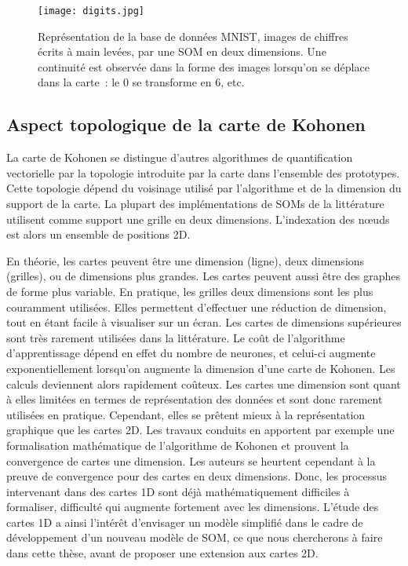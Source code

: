\documentclass[../main]{subfiles}
\begin{document}
\begin{figure}
\centering
\texttt{[image: digits.jpg]}
\caption{Représentation de la base de données MNIST, images de chiffres écrits à main levées, par une SOM en deux dimensions. Une continuité est observée dans la forme des images lorsqu'on se déplace dans la carte~: le $0$ se transforme en $6$, etc.}
\label{fig:SOM}
\end{figure}

\subsection{Aspect topologique de la carte de Kohonen}

La carte de Kohonen se distingue d'autres algorithmes de quantification vectorielle par la topologie introduite par la carte dans l'ensemble des prototypes. Cette topologie dépend du voisinage utilisé par l'algorithme et de la dimension du support de la carte.
La plupart des implémentations de SOMs de la littérature utilisent comme support une grille en deux dimensions. L'indexation des n\oe{}uds est alors un ensemble de positions 2D.

En théorie, les cartes peuvent être une dimension (ligne), deux dimensions (grilles), ou de dimensions plus grandes. Les cartes peuvent aussi être des graphes de forme plus variable. En pratique, les grilles deux dimensions sont les plus couramment utilisées. Elles permettent d'effectuer une réduction de dimension, tout en étant facile à visualiser sur un écran. Les cartes de dimensions supérieures sont très rarement utilisées dans la littérature. Le coût de l'algorithme d'apprentissage dépend en effet du nombre de neurones, et celui-ci augmente exponentiellement lorsqu'on augmente la dimension d'une carte de Kohonen. Les calculs deviennent alors rapidement coûteux.
Les cartes une dimension sont quant à elles limitées en termes de représentation des données et sont donc rarement utilisées en pratique. Cependant, elles se prêtent mieux à la représentation graphique que les cartes 2D.
Les travaux conduits en \cite{cottrell_theoretical_2016,fort_soms_2006} apportent par exemple une formalisation mathématique de l'algorithme de Kohonen et prouvent la convergence de cartes une dimension. Les auteurs se heurtent cependant à la preuve de convergence pour des cartes en deux dimensions. Donc, les processus intervenant dans des cartes 1D sont déjà mathématiquement difficiles à formaliser, difficulté qui augmente fortement avec les dimensions.
L'étude des cartes 1D a ainsi l'intérêt d'envisager un modèle simplifié dans le cadre de développement d'un nouveau modèle de SOM, ce que nous chercherons à faire dans cette thèse, avant de proposer une extension aux cartes 2D.
\end{document}
